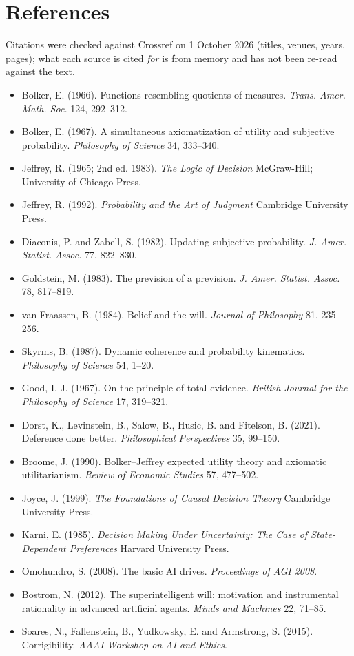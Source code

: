 \documentclass[11pt,a4paper]{article}
\begin{document}
\section*{References}
Citations were checked against Crossref on 1 October 2026 (titles, venues, years, pages); what each source is cited \emph{for} is from memory and has not been re-read against the text.
\begin{itemize}[leftmargin=1.5em,itemsep=1pt]
\item Bolker, E. (1966). Functions resembling quotients of measures. \emph{Trans. Amer. Math. Soc.} 124, 292--312.
\item Bolker, E. (1967). A simultaneous axiomatization of utility and subjective probability. \emph{Philosophy of Science} 34, 333--340.
\item Jeffrey, R. (1965; 2nd ed. 1983). \emph{The Logic of Decision} McGraw-Hill; University of Chicago Press.
\item Jeffrey, R. (1992). \emph{Probability and the Art of Judgment} Cambridge University Press.
\item Diaconis, P. and Zabell, S. (1982). Updating subjective probability. \emph{J. Amer. Statist. Assoc.} 77, 822--830.
\item Goldstein, M. (1983). The prevision of a prevision. \emph{J. Amer. Statist. Assoc.} 78, 817--819.
\item van Fraassen, B. (1984). Belief and the will. \emph{Journal of Philosophy} 81, 235--256.
\item Skyrms, B. (1987). Dynamic coherence and probability kinematics. \emph{Philosophy of Science} 54, 1--20.
\item Good, I. J. (1967). On the principle of total evidence. \emph{British Journal for the Philosophy of Science} 17, 319--321.
\item Dorst, K., Levinstein, B., Salow, B., Husic, B. and Fitelson, B. (2021). Deference done better. \emph{Philosophical Perspectives} 35, 99--150.
\item Broome, J. (1990). Bolker--Jeffrey expected utility theory and axiomatic utilitarianism. \emph{Review of Economic Studies} 57, 477--502.
\item Joyce, J. (1999). \emph{The Foundations of Causal Decision Theory} Cambridge University Press.
\item Karni, E. (1985). \emph{Decision Making Under Uncertainty: The Case of State-Dependent Preferences} Harvard University Press.
\item Omohundro, S. (2008). The basic AI drives. \emph{Proceedings of AGI 2008}.
\item Bostrom, N. (2012). The superintelligent will: motivation and instrumental rationality in advanced artificial agents. \emph{Minds and Machines} 22, 71--85.
\item Soares, N., Fallenstein, B., Yudkowsky, E. and Armstrong, S. (2015). Corrigibility. \emph{AAAI Workshop on AI and Ethics}.
\end{itemize}
\end{document}
